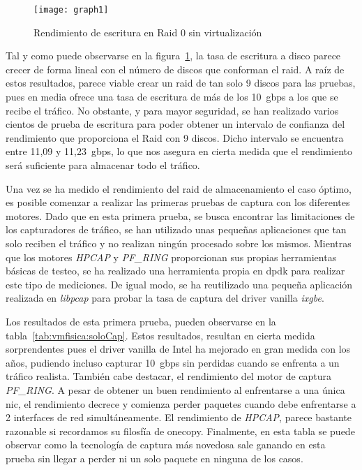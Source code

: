 \begin{figure}[!htb]
\centering
\texttt{[image: graph1]}
\caption{Rendimiento de escritura en Raid 0 sin virtualización}
\label{fig:vmfisica:graphdd}
\end{figure}

Tal y como puede observarse en la figura~\ref{fig:vmfisica:graphdd}, la tasa de escritura a disco parece crecer de forma lineal con el número de discos que conforman el raid. A raíz de estos resultados, parece viable crear un raid de tan solo 9 discos para las pruebas, pues en media ofrece una tasa de escritura de más de los 10~\gls{gbps} a los que se recibe el tráfico. No obstante, y para mayor seguridad, se han realizado varios cientos de prueba de escritura para poder obtener un intervalo de confianza del rendimiento que proporciona el Raid con 9 discos. Dicho intervalo se encuentra entre 11,09 y 11,23~\gls{gbps}, lo que nos asegura en cierta medida que el rendimiento será suficiente para almacenar todo el tráfico.

Una vez se ha medido el rendimiento del raid de almacenamiento el caso óptimo, es posible comenzar a realizar las primeras pruebas de captura con los diferentes motores.
Dado que en esta primera prueba, se busca encontrar las limitaciones de los capturadores de tráfico, se han utilizado unas pequeñas aplicaciones que tan solo reciben el tráfico y no realizan ningún procesado sobre los mismos. Mientras que los motores \textit{HPCAP} y \textit{PF\_RING} proporcionan sus propias herramientas básicas de testeo, se ha realizado una herramienta propia en \gls{dpdk} para realizar este tipo de mediciones. De igual modo, se ha reutilizado una pequeña aplicación realizada en \textit{libpcap} para probar la tasa de captura del driver \gls{vanilla} \textit{ixgbe}.

Los resultados de esta primera prueba, pueden observarse en la tabla~\ref{tab:vmfisica:soloCap}. Estos resultados, resultan en cierta medida sorprendentes pues el driver \gls{vanilla} de Intel ha mejorado en gran medida con los años, pudiendo incluso capturar 10~\gls{gbps} sin perdidas cuando se enfrenta a un tráfico realista.
También cabe destacar, el rendimiento del motor de captura \textit{PF\_RING}. A pesar de obtener un buen rendimiento al enfrentarse a una única \gls{nic}, el rendimiento decrece y comienza perder paquetes cuando debe enfrentarse a 2 interfaces de red simultáneamente.
El rendimiento de \textit{HPCAP}, parece bastante razonable si recordamos su filosfía de \gls{onecopy}. Finalmente, en esta tabla se puede observar como la tecnología de captura más novedosa sale ganando en esta prueba sin llegar a perder ni un solo paquete en ninguna de los casos.

